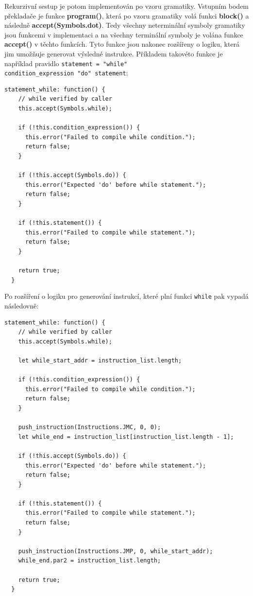 \documentclass[12pt, letterpaper]{article}
\begin{document}
Rekurzivní sestup je potom implementován po vzoru gramatiky. Vstupním bodem překladače je funkce \textbf{program()},
která po vzoru gramatiky volá funkci \textbf{block()} a následně \textbf{accept(Symbols.dot)}. Tedy všechny neterminální
symboly gramatiky jsou funkcemi v implementaci a na všechny terminální symboly je volána funkce \textbf{accept()} v 
těchto funkcích. Tyto funkce jsou nakonec rozšířeny o logiku, která jim umožňuje generovat výsledné instrukce.
Příkladem takovéto funkce je například pravidlo \texttt{statement = "while"\\ condition\_expression "do" statement}:
% 
\begin{lstlisting}[caption=statement\_while příklad bez logiky, captionpos=b]
  statement_while: function() {
    // while verified by caller
    this.accept(Symbols.while);

    if (!this.condition_expression()) {
      this.error("Failed to compile while condition.");
      return false;
    }

    if (!this.accept(Symbols.do)) {
      this.error("Expected 'do' before while statement.");
      return false;
    }

    if (!this.statement()) {
      this.error("Failed to compile while statement.");
      return false;
    }

    return true;
  }
\end{lstlisting}
%
\hfill \break
Po rozšíření o logiku pro generování instrukcí, které plní funkci \texttt{while} pak vypadá následovně:
\begin{lstlisting}[caption=statement\_while příklad s logikou, captionpos=b]
  statement_while: function() {
    // while verified by caller
    this.accept(Symbols.while);

    let while_start_addr = instruction_list.length;

    if (!this.condition_expression()) {
      this.error("Failed to compile while condition.");
      return false;
    }

    push_instruction(Instructions.JMC, 0, 0);
    let while_end = instruction_list[instruction_list.length - 1];

    if (!this.accept(Symbols.do)) {
      this.error("Expected 'do' before while statement.");
      return false;
    }

    if (!this.statement()) {
      this.error("Failed to compile while statement.");
      return false;
    }

    push_instruction(Instructions.JMP, 0, while_start_addr);
    while_end.par2 = instruction_list.length;

    return true;
  }
\end{lstlisting}
\end{document}
